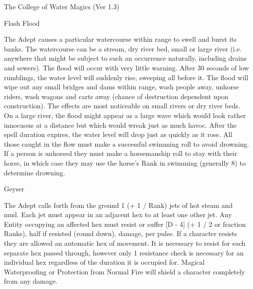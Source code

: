 \begin{Chapter}{The College of Water Magics (Ver 1.3)}
\begin{spell}[S-3]{Flash Flood}
\begin{effects}
The Adept causes a particular watercourse within range to swell and
burst its banks.  The watercourse can be a stream, dry river bed,
small or large river (i.e.  anywhere that might be subject to such an
occurrence naturally, including drains and sewers).  The flood will
occur with very little warning.  After 30 seconds of low rumblings,
the water level will suddenly rise, sweeping all before it.  The flood
will wipe out any small bridges and dams within range, wash people
away, unhorse riders, wash wagons and carts away (chance of
destruction dependent upon construction).  The effects are most
noticeable on small rivers or dry river beds. On a large river, the
flood might appear as a large wave which would look rather innocuous
at a distance but which would wreak just as much havoc.  After the
spell duration expires, the water level will drop just as quickly as
it rose.  All those caught in the flow must make a successful swimming
roll to avoid drowning.  If a person is unhorsed they must make a
horsemanship roll to stay with their horse, in which case they may use
the horse’s Rank in swimming (generally 8) to determine drowning.
\end{effects}
\end{spell}

\begin{spell}[S-4]{Geyser}

\begin{effects}
The Adept calls forth from the ground 1 (+ 1 / Rank) jets of hot steam
and mud. Each jet must appear in an adjacent hex to at least one other
jet.  Any Entity occupying an affected hex must resist or suffer [D -
  4] (+ 1 / 2 or fraction Ranks), half if resisted (round down),
damage, per pulse.  If a character resists they are allowed an
automatic hex of movement.  It is necessary to resist for each
separate hex passed through, however only 1 resistance check is
necessary for an individual hex regardless of the duration it is
occupied for. Magical Waterproofing or Protection from Normal Fire
will shield a character completely from any damage.
\end{effects}
\end{spell}


\end{Chapter}
